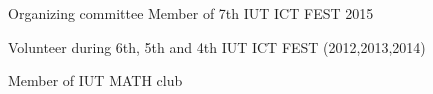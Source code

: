 \begin{cventries}
\begin{cvitems} %
	\item {Organizing committee Member of 7th IUT ICT FEST 2015}
	\item {Volunteer during 6th, 5th and 4th IUT ICT FEST (2012,2013,2014)}
	\item {Member of IUT MATH club}
\end{cvitems}
\end{cventries}